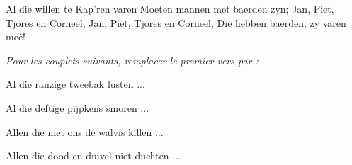 \footnotemark [
ititle={Al die willen te Kap'ren varen}]


\beginverse
Al die willen te Kap'ren varen
Moeten mannen met baerden zyn;
Jan, Piet, Tjores en Corneel,
Jan, Piet, Tjores en Corneel,
Die hebben baerden, zy varen meê!
\endverse

\emph{Pour les couplets suivants, remplacer le premier vers par :}

\beginverse
Al die ranzige tweebak lusten ...

Al die deftige pijpkens smoren ...

Allen die met ons de walvis killen ...

Allen die dood en duivel niet duchten ...
\endverse
\endsong